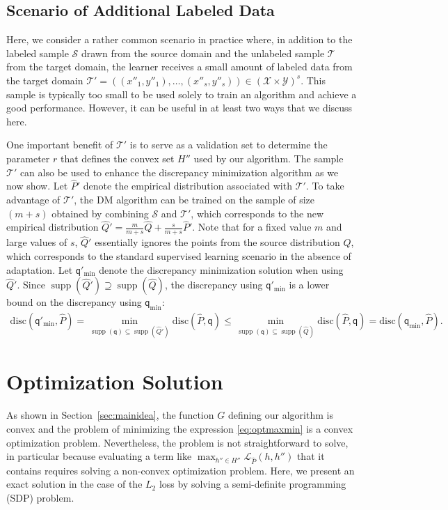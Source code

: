 \documentclass[twoside,11pt]{article}
\DeclareMathOperator{\supp}{supp}
\newcommand{\h}{\widehat}
\newcommand{\cL}{{\mathcal L}}
\newcommand{\cS}{{\mathcal S}}
\newcommand{\cT}{{\mathcal T}}
\newcommand{\cX}{{\mathcal X}}
\newcommand{\cY}{{\mathcal Y}}
\newcommand{\1}{\mat{1}}
\newcommand{\qq}{{\mathsf q}}
\newcommand{\qmin}{{\qq_\text{min}}}
\newcommand{\qpmin}{{\qq'_\text{min}}}
\newcommand{\dis}{\mathrm{disc}}
\begin{document}
\subsection{Scenario of Additional Labeled Data}
\label{sec:additional}

Here, we consider a rather common scenario in practice where, in
addition to the labeled sample $\cS$ drawn from the source domain and
the unlabeled sample $\cT$ from the target domain, the learner
receives a small amount of labeled data from the target domain
$\cT' = ((x''_1,y''_1), \ldots, (x''_{s}, y''_{s})) \in (\cX \times \cY)^{s}$.
This sample is typically too small to be used solely to train an
algorithm and achieve a good performance. However, it can be
useful in at least two ways that we discuss here.

One important benefit of $\cT'$ is to serve as a validation set to
determine the parameter $r$ that defines the convex set $H''$ used by
our algorithm. The sample $\cT'$ can also be used to enhance the
discrepancy minimization algorithm as we now show. Let $\h P'$ denote
the empirical distribution associated with $\cT'$. To take advantage
of $\cT'$, the DM algorithm can be trained on the sample of size
$(m + s)$ obtained by combining $\cS$ and $\cT'$, which corresponds to
the new empirical distribution
$\h Q' = \frac{m}{m + s} \h Q + \frac{s}{m + s} \h P'$. Note that for
a fixed value $m$ and large values of $s$, $\h Q'$ essentially ignores
the points from the source distribution $Q$, which corresponds to the
standard supervised learning scenario in the absence of
adaptation. Let $\qpmin$ denote the discrepancy minimization solution
when using $\h Q'$. Since $\supp(\h Q') \supseteq \supp(\h Q)$, the
discrepancy using $\qpmin$ is a lower bound on the discrepancy using
$\qmin$:
\begin{align*}
 \dis(\qpmin, \h P)
= \min_{\supp(\qq) \subseteq \supp(\h Q')} \dis(\h P, \qq)
\leq \min_{\supp(\qq) \subseteq \supp(\h Q)} \dis (\h P, \qq)
 = \dis(\qmin, \h P).
\end{align*}

\section{Optimization Solution}
\label{sec:optimization}

As shown in Section~\ref{sec:mainidea}, the function
$G$ defining our algorithm is convex and the problem of minimizing the
expression \eqref{eq:optmaxmin} is a convex optimization problem.
Nevertheless, the problem is not straightforward to solve, in
particular because evaluating a term like
 $\max_{h'' \in H''} \cL_{\h   P}(h, h'')$ that it contains requires
solving a non-convex optimization problem. Here, we present an exact
solution in the case of the $L_2$ loss by solving a semi-definite
programming (SDP) problem.
\end{document}
